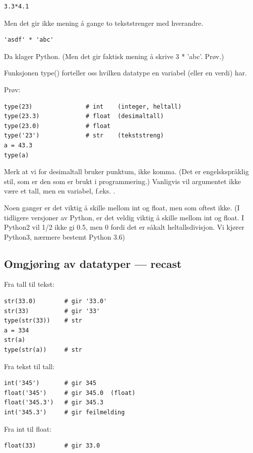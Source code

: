 \begin{lstlisting}
3.3*4.1
\end{lstlisting}

Men det gir ikke mening å gange to tekststrenger med hverandre.

\begin{lstlisting}
'asdf' * 'abc'
\end{lstlisting}

Da klager Python. (Men det gir faktisk mening å skrive 3 * 'abc'. Prøv.) 

Funksjonen type() forteller oss hvilken datatype en variabel (eller en verdi) har. 

Prøv: 
\begin{lstlisting}[caption={type()\label{lst:type}}]
type(23)               # int    (integer, heltall) 
type(23.3)             # float  (desimaltall) 
type(23.0)             # float  
type('23')             # str    (tekststreng) 
a = 43.3
type(a)
\end{lstlisting}

Merk at vi for desimaltall bruker punktum, ikke komma. (Det er engelskspråklig stil, som er den som er brukt i programmering.) Vanligvis vil argumentet ikke være et tall, men en variabel, f.eks. .

Noen ganger er det viktig å skille mellom int og float, men som oftest ikke. (I tidligere versjoner av Python, er det veldig viktig å skille mellom int og float. I Python2 vil 1/2 ikke gi 0.5, men 0 fordi det er såkalt heltallsdivisjon.  Vi kjører Python3, nærmere bestemt Python 3.6)

\subsection{Omgjøring av datatyper --- recast}

Fra tall til tekst: 
\begin{lstlisting}
str(33.0)        # gir '33.0'
str(33)          # gir '33'
type(str(33))    # str
a = 334
str(a)
type(str(a))     # str
\end{lstlisting}

Fra tekst til tall:

\begin{lstlisting} 
int('345')       # gir 345
float('345')     # gir 345.0  (float) 
float('345.3')   # gir 345.3 
int('345.3')     # gir feilmelding
\end{lstlisting}

Fra int til float: 
\begin{lstlisting}
float(33)        # gir 33.0
\end{lstlisting}

